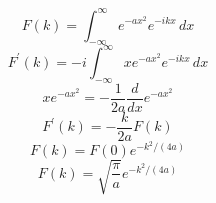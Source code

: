 \documentclass{article}
\begin{document}
\[
F(k)=\int_{-\infty}^{\infty}e^{-ax^2}e^{-ikx}\,dx
\]
\[
F^{\prime}(k)=-i\int_{-\infty}^{\infty}xe^{-ax^2}e^{-ikx}\,dx
\]
\[
xe^{-ax^2}=-\frac{1}{2a}\frac{d}{dx}e^{-ax^2}
\]
\[
F^{\prime}(k)=-\frac{k}{2a}F(k)
\]
\[
F(k)=F(0)e^{-k^2/(4a)}
\]
\[
F(k)=\sqrt{\frac{\pi}{a}}e^{-k^2/(4a)}
\]
\end{document}
